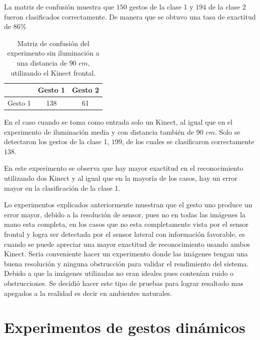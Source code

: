 \begin{itemize}
La matriz de confusión muestra que $150$ gestos de la clase 1 y $194$ de la clase 2 fueron clasificados correctamente. De manera que se obtuvo una tasa de exactitud de $86 \%$ 

\begin{table}[h!] 
\begin{center}
\begin{tabular}{ r || c | c |} 
 
        & Gesto 1 & Gesto 2 \\ \hline \hline  
Gesto 1 & 138     &  61     \\ \hline  
\end{tabular}
\end{center} 
\caption{Matriz de confusión del experimento sin iluminación a una distancia de $90$ $cm$, utilizando el Kinect frontal.}
\label{table:90LnoK1}
\end{table} 

En el caso cuando se toma como entrada solo un Kinect, al igual que en el experimento de iluminación media y con distancia también de $90$ $cm$. Solo se detectaron los gestos de la clase 1, $199$, de los cuales se clasificaron correctamente $138$. 

En este experimento se observa que hay mayor exactitud en el reconocimiento utilizando dos Kinect y al igual que en la mayoría de los casos, hay un error mayor en la clasificación de la clase 1. 


\end{itemize}

Lo experimentos explicados anteriormente muestran que el gesto uno produce un error mayor, debido a la resolución de sensor, pues no en todas las imágenes la mano esta completa, en los casos que no esta completamente vista por el sensor frontal y logra ser detectada por el sensor lateral con información favorable, es cuando se puede apreciar una mayor exactitud de reconocimiento usando ambos Kinect. 
Seria conveniente hacer un experimento donde las imágenes tengan una buena resolución y ninguna obstrucción para validar el rendimiento del sistema. Debido a que la imágenes utilizadas no eran ideales pues contenían  ruido o obstrucciones. Se decidió hacer este tipo de pruebas para lograr resaltado mas apegados a la realidad es decir en ambientes naturales. 
  



\section{Experimentos de gestos dinámicos}\label{TestDinamicGestures} 

